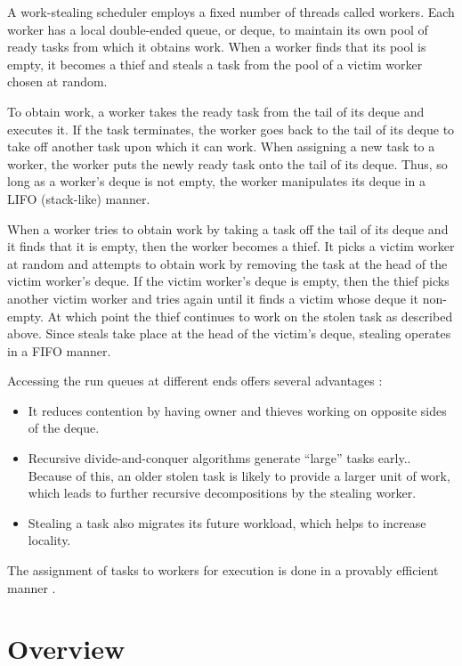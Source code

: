 A work-stealing scheduler employs a fixed number of threads called
workers. Each worker has a local double-ended queue, or deque, to
maintain its own pool of ready tasks from which it obtains work. When
a worker finds that its pool is empty, it becomes a thief and steals a
task from the pool of a victim worker chosen at random.

To obtain work, a worker takes the ready task from the tail of its
deque and executes it. If the task terminates, the worker goes back to
the tail of its deque to take off another task upon which it can
work. When assigning a new task to a worker, the worker puts the newly
ready task onto the tail of its deque. Thus, so long as a worker's
deque is not empty, the worker manipulates its deque in a LIFO
(stack-like) manner.

When a worker tries to obtain work by taking a task off the tail of
its deque and it finds that it is empty, then the worker becomes a
thief. It picks a victim worker at random and attempts to obtain work
by removing the task at the head of the victim worker's deque. If the
victim worker's deque is empty, then the thief picks another victim
worker and tries again until it finds a victim whose deque it
non-empty. At which point the thief continues to work on the stolen
task as described above. Since steals take place at the head of the
victim's deque, stealing operates in a FIFO manner.

Accessing the run queues at different ends offers several advantages
\cite{Frigo1998}:

\begin{itemize}
\item It reduces contention by having owner and thieves working on
  opposite sides of the deque.
\item Recursive divide-and-conquer algorithms generate ``large'' tasks
  early.. Because of this, an older stolen task is likely to provide a
  larger unit of work, which leads to further recursive decompositions
  by the stealing worker.
\item Stealing a task also migrates its future workload, which helps
  to increase locality.
\end{itemize}

The assignment of tasks to workers for execution is done in a provably
efficient manner \cite{Blumofe1995, Blumofe1999}.


\section{Overview}
\label{sec:intro-overview}

